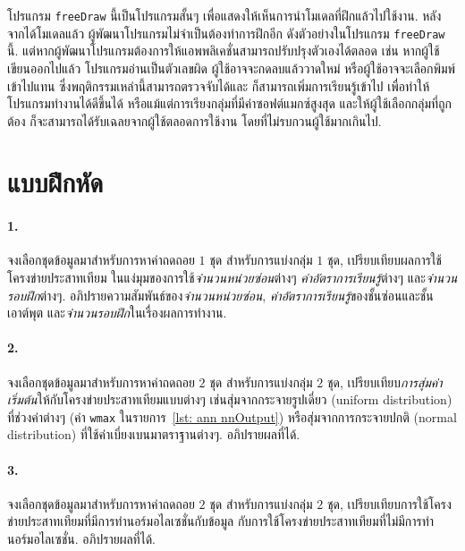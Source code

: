 

โปรแกรม \texttt{freeDraw} นี้เป็นโปรแกรมสั้นๆ เพื่อแสดงให้เห็นการนำโมเดลที่ฝึกแล้วไปใช้งาน.
หลังจากได้โมเดลแล้ว ผู้พัฒนาโปรแกรมไม่จำเป็นต้องทำการฝึกอีก ดังตัวอย่างในโปรแกรม \texttt{freeDraw} นี้.
แต่หากผู้พัฒนาโปรแกรมต้องการให้แอพพลิเคชั่นสามารถปรับปรุงตัวเองได้ตลอด 
เช่น หากผู้ใช้เขียนออกไปแล้ว โปรแกรมอ่านเป็นตัวเลขผิด 
ผู้ใช้อาจจะกดลบแล้ววาดใหม่ หรือผู้ใช้อาจจะเลือกพิมพ์เข้าไปแทน ซึ่งพฤติกรรมเหล่านี้สามารถตรวจจับได้และ ก็สามารถเพิ่มการเรียนรู้เข้าไป เพื่อทำให้โปรแกรมทำงานได้ดีขึ้นได้
หรือแม้แต่การเรียงกลุ่มที่มีค่าซอฟต์แมกซ์สูงสุด และให้ผู้ใช้เลือกกลุ่มที่ถูกต้อง ก็จะสามารถได้รับเฉลยจากผู้ใช้ตลอดการใช้งาน โดยที่ไม่รบกวนผู้ใช้มากเกินไป.
%

\section{แบบฝึกหัด}
\label{section: ANN exercises}
\paragraph{1.} 
จงเลือกชุดข้อมูลมาสำหรับการหาค่าถดถอย $1$ ชุด สำหรับการแบ่งกลุ่ม $1$ ชุด,
เปรียบเทียบผลการใช้โครงข่ายประสาทเทียม ในแง่มุมของการใช้\textit{จำนวนหน่วยซ่อน}ต่างๆ \textit{ค่าอัตราการเรียนรู้}ต่างๆ และ\textit{จำนวนรอบฝึก}ต่างๆ.
อภิปรายความสัมพันธ์ของ\textit{จำนวนหน่วยซ่อน}, \textit{ค่าอัตราการเรียนรู้}ของชั้นซ่อนและชั้นเอาต์พุต และ\textit{จำนวนรอบฝึก}ในเรื่องผลการทำงาน.

\paragraph{2.} 
จงเลือกชุดข้อมูลมาสำหรับการหาค่าถดถอย $2$ ชุด สำหรับการแบ่งกลุ่ม $2$ ชุด,
เปรียบเทียบ\textit{การสุ่มค่าเริ่มต้น}ให้กับโครงข่ายประสาทเทียมแบบต่างๆ เช่นสุ่มจากกระจายรูปเดี่ยว (uniform distribution) ที่ช่วงค่าต่างๆ (ค่า \texttt{wmax} ในรายการ~\ref{lst: ann nnOutput}) 
หรือสุ่มจากการกระจายปกติ (normal distribution) ที่ใช้ค่าเบี่ยงเบนมาตราฐานต่างๆ.
อภิปรายผลที่ได้.

\paragraph{3.} 
จงเลือกชุดข้อมูลมาสำหรับการหาค่าถดถอย $2$ ชุด สำหรับการแบ่งกลุ่ม $2$ ชุด,
เปรียบเทียบการใช้โครงข่ายประสาทเทียมที่มีการทำนอร์มอไลเซชั่นกับข้อมูล กับการใช้โครงข่ายประสาทเทียมที่ไม่มีการทำนอร์มอไลเซชั่น.
อภิปรายผลที่ได้.

